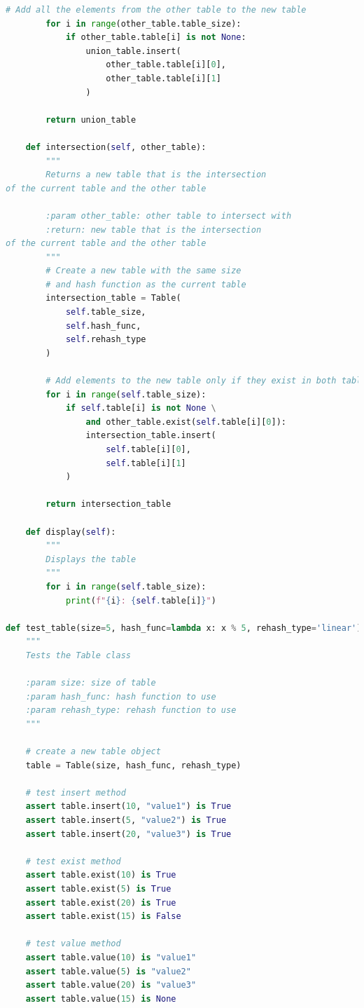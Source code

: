 \documentclass{article}
\begin{document}
\begin{lstlisting}[language=Python,label={lst:codesrc}]
        # Add all the elements from the other table to the new table
        for i in range(other_table.table_size):
            if other_table.table[i] is not None:
                union_table.insert(
                    other_table.table[i][0],
                    other_table.table[i][1]
                )

        return union_table

    def intersection(self, other_table):
        """
        Returns a new table that is the intersection
of the current table and the other table

        :param other_table: other table to intersect with
        :return: new table that is the intersection
of the current table and the other table
        """
        # Create a new table with the same size
        # and hash function as the current table
        intersection_table = Table(
            self.table_size,
            self.hash_func,
            self.rehash_type
        )

        # Add elements to the new table only if they exist in both tables
        for i in range(self.table_size):
            if self.table[i] is not None \
                and other_table.exist(self.table[i][0]):
                intersection_table.insert(
                    self.table[i][0],
                    self.table[i][1]
            )

        return intersection_table

    def display(self):
        """
        Displays the table
        """
        for i in range(self.table_size):
            print(f"{i}: {self.table[i]}")

def test_table(size=5, hash_func=lambda x: x % 5, rehash_type='linear'):
    """
    Tests the Table class

    :param size: size of table
    :param hash_func: hash function to use
    :param rehash_type: rehash function to use
    """

    # create a new table object
    table = Table(size, hash_func, rehash_type)

    # test insert method
    assert table.insert(10, "value1") is True
    assert table.insert(5, "value2") is True
    assert table.insert(20, "value3") is True

    # test exist method
    assert table.exist(10) is True
    assert table.exist(5) is True
    assert table.exist(20) is True
    assert table.exist(15) is False

    # test value method
    assert table.value(10) is "value1"
    assert table.value(5) is "value2"
    assert table.value(20) is "value3"
    assert table.value(15) is None


\end{lstlisting}
\end{document}
